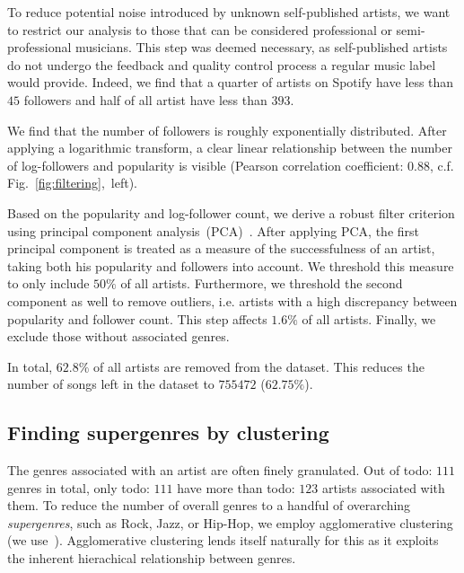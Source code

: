 \documentclass{article}
\newcommand{\todo}[1]{{\color{red}todo: #1}}
\begin{document}

To reduce potential noise introduced by unknown self-published artists, we want to restrict our analysis to those that can be considered professional or semi-professional musicians. This step was deemed necessary, as self-published artists do not undergo the feedback and quality control process a regular music label would provide. Indeed, we find that a quarter of artists on Spotify have less than $45$ followers and half of all artist have less than $393$.

We find that the number of followers is roughly exponentially distributed. After applying a logarithmic transform, a clear linear relationship between the number of log-followers and popularity is visible (Pearson correlation coefficient: $0.88$, c.f. Fig.~\ref{fig:filtering},~left). 

Based on the popularity and log-follower count, we derive a robust filter criterion using principal component analysis~(PCA)~\cite{jolliffe2016principal}. After applying PCA, the first principal component is treated as a measure of the successfulness of an artist, taking both his popularity and followers into account. We threshold this measure to only include $50\%$ of all artists. Furthermore, we threshold the second component as well to remove outliers, i.e. artists with a high discrepancy between popularity and follower count. This step affects $1.6\%$ of all artists. Finally, we exclude those without associated genres.

In total, $62.8\%$ of all artists are removed from the dataset. This reduces the number of songs left in the dataset to $755472$ ($62.75\%$).

\subsection{Finding supergenres by clustering}
\label{sec:genre_clustering}
The genres associated with an artist are often finely granulated. Out of \todo{$111$} genres in total, only \todo{$111$} have more than \todo{$123$} artists associated with them. To reduce the number of overall genres to a handful of overarching \emph{supergenres}, such as Rock, Jazz, or Hip-Hop, we employ agglomerative clustering~\cite{ward1963hierarchical} (we use~\cite{scikit-learn}). Agglomerative clustering lends itself naturally for this as it exploits the inherent hierachical relationship between genres.
\end{document}

